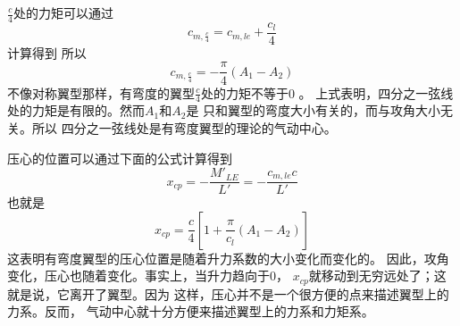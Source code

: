 $\frac{c}{4}$处的力矩可以通过
\[
  c_{m,\frac{c}{4}}=c_{m,le}+\frac{c_l}{4}
\]
计算得到
所以
\[
  c_{m,\frac{c}{4}}=-\frac{\pi}{4}\left(A_1-A_2\right)
\]
不像对称翼型那样，有弯度的翼型$\frac{c}{4}$处的力矩不等于0 。
上式表明，四分之一弦线处的力矩是有限的。然而$A_1$和$A_2$是
只和翼型的弯度大小有关的，而与攻角大小无关。所以
四分之一弦线处是有弯度翼型的理论的气动中心。

压心的位置可以通过下面的公式计算得到
\[
  x_{cp}=-\frac{M'_{LE}}{L'}=-\frac{c_{m,le}c}{L'}
\]
也就是
\[
  x_{cp}=\frac{c}{4}\left[1+\frac{\pi}{c_l}\left(A_1-A_2\right)\right]
\]
这表明有弯度翼型的压心位置是随着升力系数的大小变化而变化的。
因此，攻角变化，压心也随着变化。事实上，当升力趋向于0，
$x_{cp}$就移动到无穷远处了；这就是说，它离开了翼型。因为
这样，压心并不是一个很方便的点来描述翼型上的力系。反而，
气动中心就十分方便来描述翼型上的力系和力矩系。


